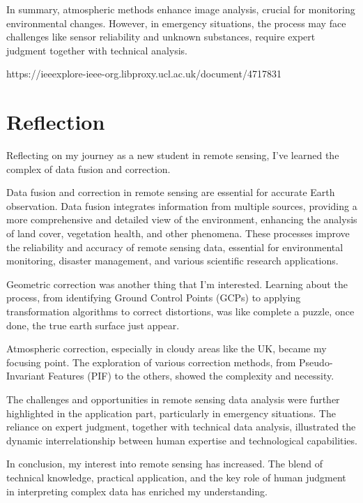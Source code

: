 \documentclass[
  letterpaper,
  DIV=11,
  numbers=noendperiod]{scrreprt}
\begin{document}
In summary, atmospheric methods enhance image analysis, crucial for
monitoring environmental changes. However, in emergency situations, the
process may face challenges like sensor reliability and unknown
substances, require expert judgment together with technical analysis.

https://ieeexplore-ieee-org.libproxy.ucl.ac.uk/document/4717831


\chapter{Reflection}\label{reflection-1}

Reflecting on my journey as a new student in remote sensing, I've
learned the complex of data fusion and correction.

Data fusion and correction in remote sensing are essential for accurate
Earth observation. Data fusion integrates information from multiple
sources, providing a more comprehensive and detailed view of the
environment, enhancing the analysis of land cover, vegetation health,
and other phenomena. These processes improve the reliability and
accuracy of remote sensing data, essential for environmental monitoring,
disaster management, and various scientific research applications.

Geometric correction was another thing that I'm interested. Learning
about the process, from identifying Ground Control Points (GCPs) to
applying transformation algorithms to correct distortions, was like
complete a puzzle, once done, the true earth surface just appear.

Atmospheric correction, especially in cloudy areas like the UK, became
my focusing point. The exploration of various correction methods, from
Pseudo-Invariant Features (PIF) to the others, showed the complexity and
necessity.

The challenges and opportunities in remote sensing data analysis were
further highlighted in the application part, particularly in emergency
situations. The reliance on expert judgment, together with technical
data analysis, illustrated the dynamic interrelationship between human
expertise and technological capabilities.

In conclusion, my interest into remote sensing has increased. The blend
of technical knowledge, practical application, and the key role of human
judgment in interpreting complex data has enriched my understanding.
\end{document}
